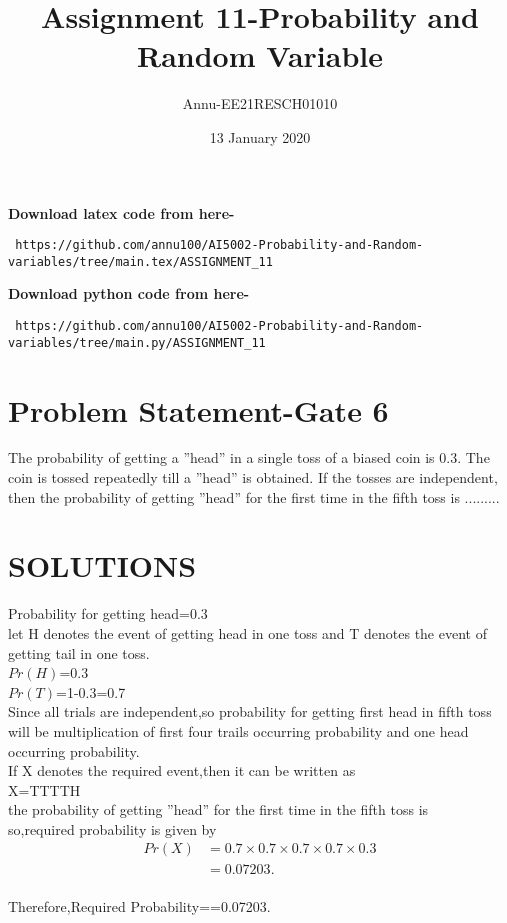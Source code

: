 \documentclass[journel,12pt,twocoloums]{IEEEtran}
\title{Assignment 11-Probability and Random Variable}
\author{Annu-EE21RESCH01010}
\date{13 January 2020}
\begin{document}
 \maketitle
\textbf{Download latex code from here-}\\
\begin{lstlisting}
 https://github.com/annu100/AI5002-Probability-and-Random-variables/tree/main.tex/ASSIGNMENT_11
 \end{lstlisting}
\textbf{Download python code from here-}\\
\begin{lstlisting}
 https://github.com/annu100/AI5002-Probability-and-Random-variables/tree/main.py/ASSIGNMENT_11
 \end{lstlisting}
 \section{Problem Statement-Gate 6}

The probability of getting a ”head” in a single
toss of a biased coin is 0.3. The coin is tossed
repeatedly till a ”head” is obtained. If the tosses
are independent, then the probability of getting
”head” for the first time in the fifth toss is .........

\section{SOLUTIONS}

\begin{flushleft}
Probability for getting head=0.3\\
let H denotes the event of getting head in  one toss and T denotes the event of getting tail in one toss.\\

$Pr(H)$=0.3\\
$Pr(T)$=1-0.3=0.7\\


Since all trials are independent,so probability for getting first head in fifth toss will be multiplication of first four trails occurring probability and one head occurring probability.\\

If X denotes the required event,then it can be written as \\
X=TTTTH\\

the probability of getting
”head” for the first time in the fifth toss is\\
so,required probability is given by\\
\begin{align*}
            Pr(X) &= 0.7 \times 0.7 \times 0.7 \times 0.7 \times 0.3\\
                  &=0.07203.\\   
\end{align*}

Therefore,Required Probability==0.07203.\\

\end{flushleft}
\end{document}
